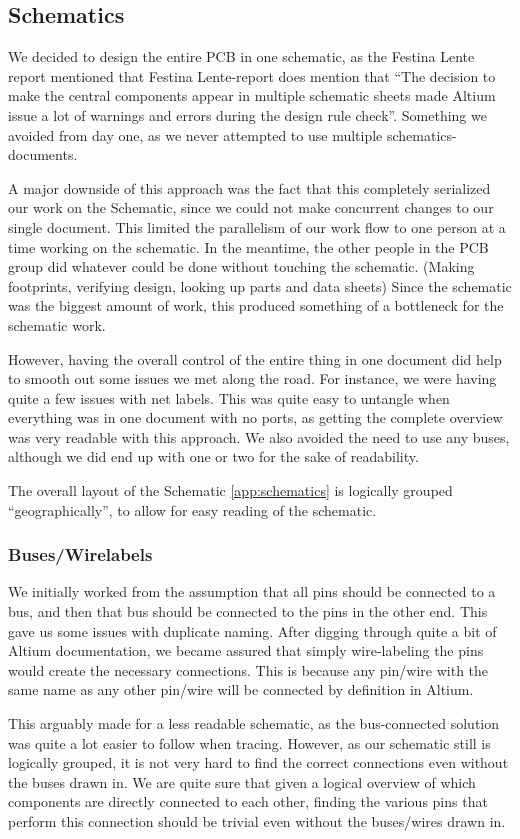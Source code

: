 \subsection {Schematics}

We decided to design the entire \ac{PCB} in one schematic, as the Festina Lente
report mentioned that Festina Lente-report does mention that 
``The decision to make the central components appear in multiple schematic
sheets made Altium issue a lot of warnings and errors during the design rule 
check''\cite[p.~49]{berg2011festinalente}. Something we avoided from day one, 
as we never attempted to use multiple schematics-documents.

A major downside of this approach was the fact that this completely serialized
our work on the Schematic, since we could not make concurrent changes to our
single document. This limited the parallelism of our work flow to one person at a
time working on the schematic.  In the meantime, the other people in the
\ac{PCB} group did whatever could be done without touching the
schematic. (Making footprints, verifying design, looking up parts and data
sheets) Since the schematic was the biggest amount of work, this produced
something of a bottleneck for the schematic work.

However, having the overall control of the entire thing in one document
did help to smooth out some issues we met along the road. For instance,
we were having quite a few issues with net labels. This was quite easy to
untangle when everything was in one document with no ports, as getting the
complete overview was very readable with this approach. We also avoided the need
to use any buses, although we did end up with one or two for the sake
of readability.

The overall layout of the Schematic \ref{app:schematics} is logically grouped ``geographically'', to
allow for easy reading of the schematic.

\subsubsection {Buses/Wirelabels}
We initially worked from the assumption that all pins should be connected to a
bus, and then that bus should be connected to the pins in the other end. This
gave us some issues with duplicate naming. After digging through quite a bit of
Altium documentation, we became assured that simply wire-labeling the pins
would create the necessary connections. This is because any pin/wire with the
same name as any other pin/wire will be connected by definition in Altium.

This arguably made for a less readable schematic, as the bus-connected solution
was quite a lot easier to follow when tracing. However, as our schematic still
is logically grouped, it is not very hard to find the correct connections even
without the buses drawn in. We are quite sure that given a logical overview of
which components are directly connected to each other, finding the various pins
that perform this connection should be trivial even without the buses/wires
drawn in.

